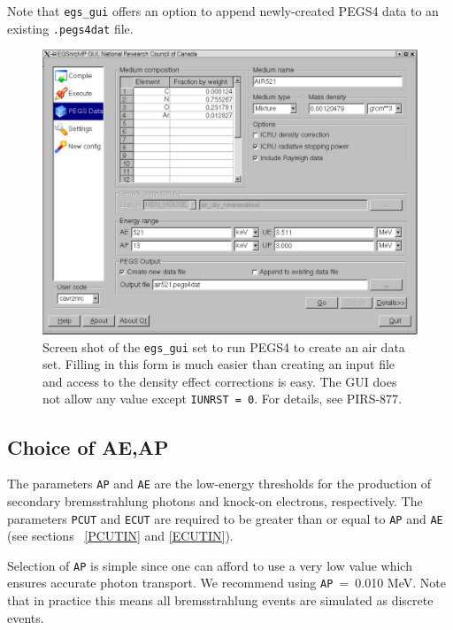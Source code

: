\documentclass[12pt,twoside]{article}
\begin{document}
Note that {\tt egs\_gui} offers an option to append newly-created
PEGS4 data to an existing {\tt .pegs4dat} file.

\begin{figure}[htb]
   \leavevmode
   \begin{center}
   \includegraphics[width=12cm]{figures/egs_gui_pegs4_screen}
    \end{center}
   \caption{Screen shot of the {\tt egs\_gui} set to run PEGS4 to create
an air data set. Filling in this form is much easier than creating an input
file and access to the density effect corrections is easy. The GUI
does not allow any value except {\tt IUNRST = 0}. For details, see
PIRS-877\cite{Ka03}. }
   \label{fig_pegs4_screen}
\end{figure}

\subsection{Choice of AE,AP}
 
\label{AE}
  

The parameters  \verb+AP+ and  \verb+AE+ are the low-energy thresholds
for the production of secondary bremsstrahlung photons and knock-on
electrons, respectively.  The parameters \verb+PCUT+ and \verb+ECUT+ are
required to be greater than or equal to \verb+AP+ and  \verb+AE+ (see
sections ~\ref{PCUTIN} and \ref{ECUTIN}).

Selection of \verb+AP+ is simple since one can afford to use a very low
value which ensures accurate photon transport.  We recommend using
\verb+AP+~=~0.010 MeV.  Note that in practice this means all
bremsstrahlung events are simulated as discrete events.
\end{document}
